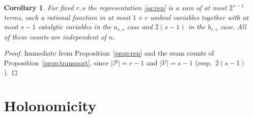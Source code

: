 \documentclass[11pt]{article}
\newtheorem{corollary}[theorem]{Corollary}
\theoremstyle{definition}
\newcommand{\ars}{a_{r,s}}
\newcommand{\brs}{b_{r,s}}
\begin{document}
\begin{corollary}\label{cor:bounded}
For fixed $r,s$ the representation \eqref{eq:rep} is a sum of at most
$2^{\,r-1}$ terms, each a rational function in at most $1+r$ umbral variables
together with at most $s-1$ catalytic variables in the $\ars$ case and
$2(s-1)$ in the $\brs$ case. All of these counts are independent of $n$.
\end{corollary}

\begin{proof}
Immediate from Proposition~\ref{prop:rep} and the seam counts of
Proposition~\ref{prop:transport}, since $|\mathcal{P}|=r-1$ and
$|\mathcal{V}|=s-1$ (resp.\ $2(s-1)$).
\end{proof}

\section{Holonomicity}\label{sec:hol}
\end{document}

